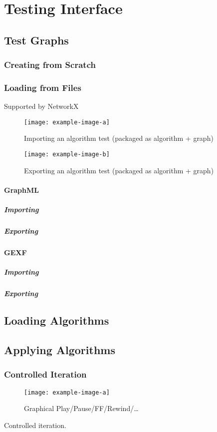 \section{Testing Interface}
\label{sec:interface-testing}

\subsection{Test Graphs}
\subsubsection{Creating from Scratch}
\subsubsection{Loading from Files}
\label{sec:interface-testing:import}
Supported by NetworkX~\autocite{hagberg:networkx}
\begin{figure}
  \centering
  \texttt{[image: example-image-a]}
  \caption{Importing an algorithm test (packaged as algorithm + graph)}
  \label{fig:iface:alg-test-import}
\end{figure}
\begin{figure}
  \centering
  \texttt{[image: example-image-b]}
  \caption{Exporting an algorithm test (packaged as algorithm + graph)}
  \label{fig:iface:alg-test-export}
\end{figure}
\paragraph{GraphML}
\subparagraph{Importing}
\subparagraph{Exporting}

\paragraph{GEXF}
\subparagraph{Importing}
\subparagraph{Exporting}

\subsection{Loading Algorithms} %
\subsection{Applying Algorithms}
\subsubsection{Controlled Iteration}
\begin{figure}
  \centering
  \texttt{[image: example-image-a]}
  \caption{Graphical Play\slash Pause\slash FF\slash Rewind\slash\dots}
  \label{fig:iface:alg-test-controlled}
\end{figure}
\begin{draftvspace}{2in}
  Controlled iteration.
\end{draftvspace}
